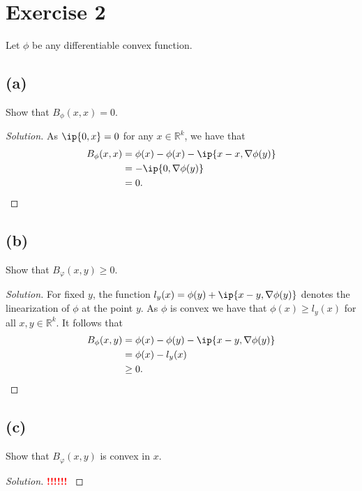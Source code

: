 \documentclass[10pt, a4paper, twoside]{amsart}
\newcommand{\R}{\ensuremath{\mathbb{R}}}
\DeclarePairedDelimiter{\ip}\langle\rangle
\newenvironment{solution}
               {\let\oldqedsymbol=\qedsymbol
                \renewcommand{\qedsymbol}{$\blacktriangleleft$}
                \begin{proof}[Solution]}
               {\end{proof}
                \renewcommand{\qedsymbol}{\oldqedsymbol}}
\newcommand{\TODO}{\textcolor{red}{\textbf{!!!!!! }}}
\begin{document}
\section*{Exercise 2}
Let $\phi$ be any differentiable convex function.
\subsection*{(a)}
Show that $B_{\phi}(x,x)=0$.
\begin{solution}
As $\ip{0,x}=0$ for any $x \in  \R^k$, we have that
\begin{align*}
  B_{\phi}(x,x)&=\phi(x)-\phi(x)-\ip{x-x,\nabla \phi(y)} \\
  &=-\ip{0,\nabla \phi(y)} \\
  &=0.
\end{align*}
\end{solution}

\subsection*{(b)}
Show that $B_{\varphi}(x,y)\geq 0$.
\begin{solution}
For fixed $y$, the function $l_y(x)=\phi(y)+\ip{x-y, \nabla \phi(y)}$ denotes the linearization of $\phi$ at the point $y$.
As $\phi$ is convex we have that $\phi(x)\geq l_y(x)$ for all $x,y \in \R^k$. 
It follows that 
\begin{align*}
 B_{\phi}(x,y)&=\phi(x)-\phi(y)-\ip{x-y, \nabla \phi(y)} \\
 &=\phi(x)-l_y(x) \\
 &\geq0.
\end{align*}
\end{solution}

\subsection*{(c)}
Show that $B_{\varphi}(x,y)$ is convex in $x$.
\begin{solution}
\TODO 
\end{solution}
\end{document}
